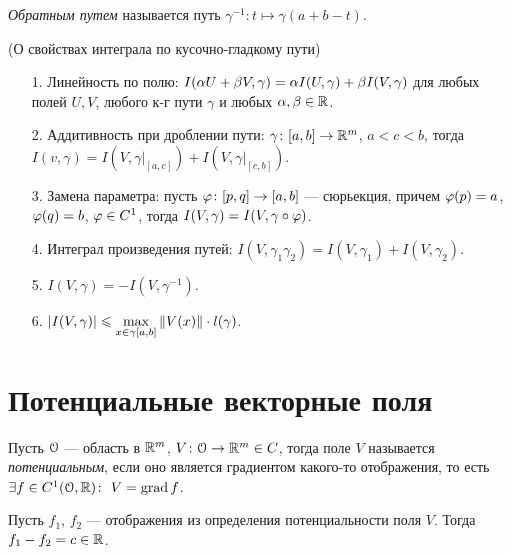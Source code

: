 \begin{definition}
    \textit{Обратным путем} называется путь $\gamma^{-1}: t \mapsto \gamma(a + b -
    t)$.
\end{definition}

\begin{theorem}(О свойствах интеграла по кусочно-гладкому пути)

    \begin{itemize}
        \item[1.] Линейность по полю:
            $I(\alpha U + \beta V, \gamma) = \alpha I(U, \gamma) + \beta I(V, \gamma)$ для любых
            полей $U, V$, любого к-г пути $\gamma$ и любых $\alpha, \beta \in \mathbb{R}$.
        \item[2.] Аддитивность при дроблении пути:
            $\gamma \colon [a, b] \to \mathbb{R}^m$, $a < c < b$, тогда \\
            $I(v, \gamma) = I(V, \gamma\big|_{[a, c]}) + I(V, \gamma\big|_{[c,
            b]})$.
        \item[3.] Замена параметра:
            пусть $\varphi \colon [p, q] \to [a, b]$ --- сюрьекция, причем $\varphi(p) = a$,
            $\varphi(q) = b$, $\varphi \in C^1$, тогда $I(V, \gamma) = I(V, \gamma \circ \varphi)$.
        \item[4.] Интеграл произведения путей:
            $I(V, \gamma_1 \gamma_2) = I(V, \gamma_1) + I(V, \gamma_2)$.
        \item[5.] $I(V, \gamma) = -I(V, \gamma^{-1})$.
        \item[6.] $\displaystyle |I(V, \gamma)| \leqslant \max_{x \in \gamma[a,
        b]}{\left\lVert V(x)\right\rVert} \cdot l(\gamma)$.
    \end{itemize}
\end{theorem}

\section{Потенциальные векторные поля}

\begin{definition}
    Пусть $\mathcal{O}$ --- область в $\mathbb{R}^m$, $V \colon \mathcal{O} \to \mathbb{R}^m \in C$, тогда поле
    $V$ называется \textit{потенциальным}, если оно является градиентом какого-то
    отображения, то есть $\exists f \in C^1(\mathcal{O}, \mathbb{R})\colon~ V = \operatorname{grad}
    f$.
\end{definition}

\begin{lemma}
    Пусть $f_1$, $f_2$ --- отображения из определения потенциальности поля $V$.
    Тогда $f_1 - f_2 = c \in \mathbb{R}$.
\end{lemma}

